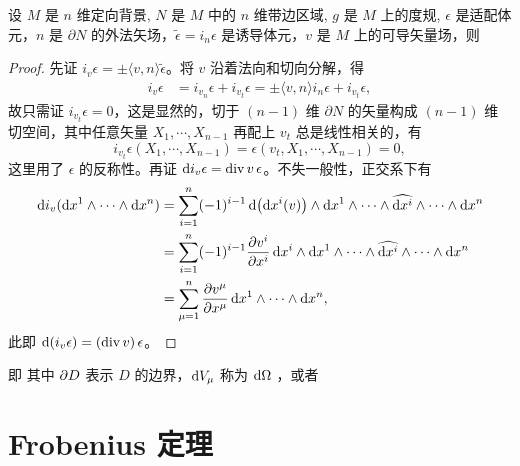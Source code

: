 \begin{theorem}[Gauss]
    设 $M$ 是 $n$ 维定向背景, $N$ 是 $M$ 中的 $n$ 维带边区域, $g$ 是 $M$ 上的度规, $\epsilon$ 是适配体元，$n$ 是 $\partial N$ 的外法矢场，$\tilde\epsilon=i_n \epsilon$ 是诱导体元，$v$ 是 $M$ 上的可导矢量场，则
\end{theorem}
\begin{proof}
    先证 $i_v\epsilon=\pm\langle v,n\rangle \tilde\epsilon$。将 $v$ 沿着法向和切向分解，得
    \begin{align*}
        i_v\epsilon&=i_{v_n}\epsilon+i_{v_t}\epsilon=\pm\langle v,n\rangle i_{n}\epsilon+i_{v_t}\epsilon,
    \end{align*}
    故只需证 $i_{v_t}\epsilon=0$，这是显然的，切于 $(n-1)$ 维 $\partial N$ 的矢量构成 $(n-1)$ 维切空间，其中任意矢量 $X_1,\cdots,X_{n-1}$ 再配上 $v_t$ 总是线性相关的，有
    \[
    i_{v_t}\epsilon(X_1,\cdots,X_{n-1})=\epsilon(v_t,X_1,\cdots,X_{n-1})=0,
    \]
    这里用了 $\epsilon$ 的反称性。再证 $\dd i_v\epsilon=\operatorname{div} v\,\epsilon$。不失一般性，正交系下有
    \begin{align*}
        \dd i_v(\dd x^1\wedge\cdots\wedge\dd x^n)&= \sum_{i=1}^n (-1)^{i-1} \dd(\dd x^i(v))\wedge\dd x^1 \wedge \cdots \wedge \widehat{\dd x^i}\wedge \cdots \wedge \dd x^n\\
        &=\sum_{i=1}^n (-1)^{i-1} \pdv{v^i}{x^i}\,\dd x^i\wedge\dd x^1 \wedge \cdots \wedge \widehat{\dd x^i}\wedge \cdots \wedge \dd x^n\\
        &=\sum_{\mu=1}^n\pdv{v^\mu}{x^\mu}\,\dd x^1\wedge\cdots\wedge\dd x^n,
    \end{align*}
    此即 $\dd(i_v\epsilon)=(\operatorname{div} v)\,\epsilon$。
\end{proof}


即
其中 $\partial D$ 表示 $D$ 的边界，$\dd V_\mu$ 称为 $\dd{\Omega}$ ，或者


\section{Frobenius 定理}\label{sec:Frobenius}


